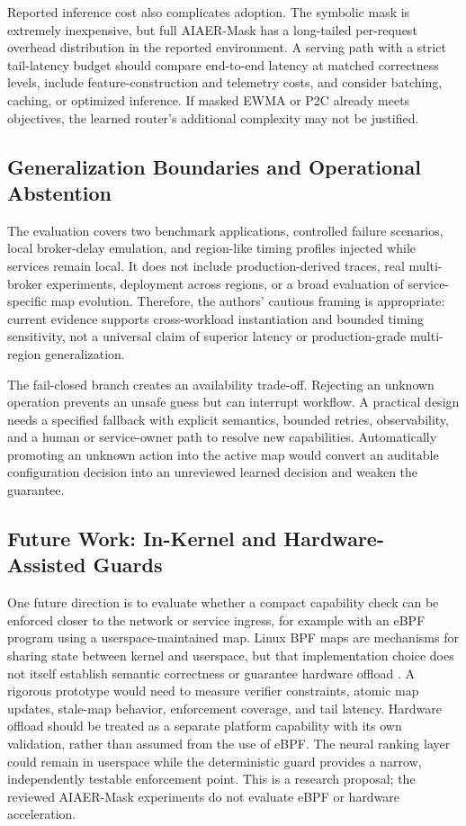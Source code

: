 \documentclass[conference]{IEEEtran}
\begin{document}
Reported inference cost also complicates adoption. The symbolic mask is extremely inexpensive, but full AIAER-Mask has a long-tailed per-request overhead distribution in the reported environment. A serving path with a strict tail-latency budget should compare end-to-end latency at matched correctness levels, include feature-construction and telemetry costs, and consider batching, caching, or optimized inference. If masked EWMA or P2C already meets objectives, the learned router's additional complexity may not be justified.

\subsection{Generalization Boundaries and Operational Abstention}
The evaluation covers two benchmark applications, controlled failure scenarios, local broker-delay emulation, and region-like timing profiles injected while services remain local. It does not include production-derived traces, real multi-broker experiments, deployment across regions, or a broad evaluation of service-specific map evolution. Therefore, the authors' cautious framing is appropriate: current evidence supports cross-workload instantiation and bounded timing sensitivity, not a universal claim of superior latency or production-grade multi-region generalization.

The fail-closed branch creates an availability trade-off. Rejecting an unknown operation prevents an unsafe guess but can interrupt workflow. A practical design needs a specified fallback with explicit semantics, bounded retries, observability, and a human or service-owner path to resolve new capabilities. Automatically promoting an unknown action into the active map would convert an auditable configuration decision into an unreviewed learned decision and weaken the guarantee.

\subsection{Future Work: In-Kernel and Hardware-Assisted Guards}
One future direction is to evaluate whether a compact capability check can be enforced closer to the network or service ingress, for example with an eBPF program using a userspace-maintained map. Linux BPF maps are mechanisms for sharing state between kernel and userspace, but that implementation choice does not itself establish semantic correctness or guarantee hardware offload \cite{linuxbpfmaps}. A rigorous prototype would need to measure verifier constraints, atomic map updates, stale-map behavior, enforcement coverage, and tail latency. Hardware offload should be treated as a separate platform capability with its own validation, rather than assumed from the use of eBPF. The neural ranking layer could remain in userspace while the deterministic guard provides a narrow, independently testable enforcement point. This is a research proposal; the reviewed AIAER-Mask experiments do not evaluate eBPF or hardware acceleration.
\end{document}
